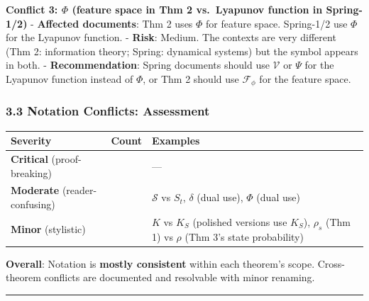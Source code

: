 \documentclass[
  12pt,
]{article}
\begin{document}
\textbf{Conflict 3: \(\Phi\) (feature space in Thm 2 vs.~Lyapunov
function in Spring-1/2)} - \textbf{Affected documents}: Thm 2 uses
\(\Phi\) for feature space. Spring-1/2 use \(\Phi\) for the Lyapunov
function. - \textbf{Risk}: Medium. The contexts are very different (Thm
2: information theory; Spring: dynamical systems) but the symbol appears
in both. - \textbf{Recommendation}: Spring documents should use
\(\mathcal{V}\) or \(\Psi\) for the Lyapunov function instead of
\(\Phi\), or Thm 2 should use \(\mathcal{F}_{\phi}\) for the feature
space.

\subsubsection{3.3 Notation Conflicts:
Assessment}\label{notation-conflicts-assessment}

\begin{longtable}[]{@{}
  >{\raggedright\arraybackslash}p{}
  >{\raggedright\arraybackslash}p{}
  >{\raggedright\arraybackslash}p{}@{}}
\toprule\noalign{}
\begin{minipage}[b]{\linewidth}\raggedright
Severity
\end{minipage} & \begin{minipage}[b]{\linewidth}\raggedright
Count
\end{minipage} & \begin{minipage}[b]{\linewidth}\raggedright
Examples
\end{minipage} \\
\midrule\noalign{}
\endhead
\bottomrule\noalign{}
\endlastfoot
\textbf{Critical} (proof-breaking) & 0 & --- \\
\textbf{Moderate} (reader-confusing) & 3 & \(\mathcal{S}\) vs \(S_t\),
\(\delta\) (dual use), \(\Phi\) (dual use) \\
\textbf{Minor} (stylistic) & 2 & \(K\) vs \(K_S\) (polished versions use
\(K_S\)), \(\rho_s\) (Thm 1) vs \(\rho\) (Thm 3's state probability) \\
\end{longtable}

\textbf{Overall}: Notation is \textbf{mostly consistent} within each
theorem's scope. Cross-theorem conflicts are documented and resolvable
with minor renaming.

\begin{center}\rule{0.5\linewidth}{0.5pt}\end{center}
\end{document}

